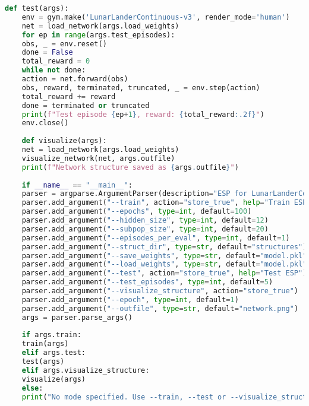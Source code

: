 \documentclass[a4paper,12pt]{article}
\begin{document}
\begin{lstlisting}[language=Python, caption={esp\_lander.py}]
	def test(args):
	env = gym.make('LunarLanderContinuous-v3', render_mode='human')
	net = load_network(args.load_weights)
	for ep in range(args.test_episodes):
	obs, _ = env.reset()
	done = False
	total_reward = 0
	while not done:
	action = net.forward(obs)
	obs, reward, terminated, truncated, _ = env.step(action)
	total_reward += reward
	done = terminated or truncated
	print(f"Test episode {ep+1}, reward: {total_reward:.2f}")
	env.close()
	
	def visualize(args):
	net = load_network(args.load_weights)
	visualize_network(net, args.outfile)
	print(f"Network structure saved as {args.outfile}")
	
	if __name__ == "__main__":
	parser = argparse.ArgumentParser(description="ESP for LunarLanderContinuous-v3")
	parser.add_argument("--train", action="store_true", help="Train ESP")
	parser.add_argument("--epochs", type=int, default=100)
	parser.add_argument("--hidden_size", type=int, default=12)
	parser.add_argument("--subpop_size", type=int, default=20)
	parser.add_argument("--episodes_per_eval", type=int, default=1)
	parser.add_argument("--struct_dir", type=str, default="structures")
	parser.add_argument("--save_weights", type=str, default="model.pkl")
	parser.add_argument("--load_weights", type=str, default="model.pkl")
	parser.add_argument("--test", action="store_true", help="Test ESP")
	parser.add_argument("--test_episodes", type=int, default=5)
	parser.add_argument("--visualize_structure", action="store_true")
	parser.add_argument("--epoch", type=int, default=1)
	parser.add_argument("--outfile", type=str, default="network.png")
	args = parser.parse_args()
	
	if args.train:
	train(args)
	elif args.test:
	test(args)
	elif args.visualize_structure:
	visualize(args)
	else:
	print("No mode specified. Use --train, --test or --visualize_structure.")
\end{lstlisting}
\end{document}
